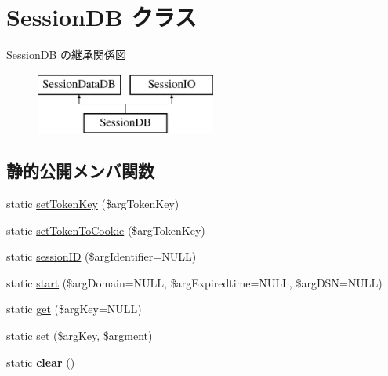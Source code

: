 \hypertarget{class_session_d_b}{}\section{Session\+D\+B クラス}
\label{class_session_d_b}
Session\+D\+B の継承関係図\begin{figure}[H]
\begin{center}
\leavevmode
\includegraphics[height=2.000000cm]{class_session_d_b}
\end{center}
\end{figure}
\subsection*{静的公開メンバ関数}
\begin{DoxyCompactItemize}
\item 
static \hyperlink{class_session_d_b_a1229c629f73d4b80e2b3feab4147eefb}{set\+Token\+Key} (\$arg\+Token\+Key)
\item 
static \hyperlink{class_session_d_b_af7d47daa6b652fe112e59530e60df922}{set\+Token\+To\+Cookie} (\$arg\+Token\+Key)
\item 
static \hyperlink{class_session_d_b_abcf6313d78bbf6ecf53ba5fba312d55f}{session\+I\+D} (\$arg\+Identifier=N\+U\+L\+L)
\item 
static \hyperlink{class_session_d_b_a8f5f5c56a8e2307f61ac7fbc6869a272}{start} (\$arg\+Domain=N\+U\+L\+L, \$arg\+Expiredtime=N\+U\+L\+L, \$arg\+D\+S\+N=N\+U\+L\+L)
\item 
static \hyperlink{class_session_d_b_a956124a9e132a41c428e4befd24d1b52}{get} (\$arg\+Key=N\+U\+L\+L)
\item 
static \hyperlink{class_session_d_b_a14c8618d095cd1d5ba655fc673eb2488}{set} (\$arg\+Key, \$argment)
\item 
\hypertarget{class_session_d_b_a2dd2181533bf5da156da2793f11390f8}{}static {\bfseries clear} ()\label{class_session_d_b_a2dd2181533bf5da156da2793f11390f8}

\end{DoxyCompactItemize}

